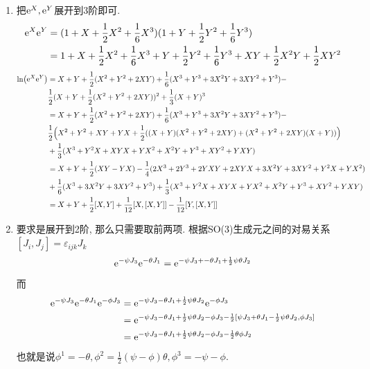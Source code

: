 \begin{solution}
    \begin{enumerate}[label=(\arabic*)]
        \item 把$\mathrm e^{X},\mathrm e^{Y}$展开到3阶即可. 
            \begin{align*}
                \mathrm e^{X}\mathrm e^{Y}&=(1+X+\frac12X^2+\frac16X^3)(1+Y+\frac12Y^2+\frac16Y^3)\\&=
                1+X+\frac12X^2+\frac16X^3+Y+\frac12Y^2+\frac16Y^3+XY+\frac12X^2Y+\frac12XY^2
            \end{align*}
            \begin{align*}
                \ln(\mathrm e^{X}\mathrm e^{Y})&=X+Y+\frac12(X^2+Y^2+2XY)+\frac16(X^3+Y^3+3X^2Y+3XY^2+Y^3)-\\&\frac12(X+Y+\frac12(X^2+Y^2+2XY))^2+\frac13(X+Y)^3\\&=X+Y+\frac12(X^2+Y^2+2XY)+\frac16(X^3+Y^3+3X^2Y+3XY^2+Y^3)-\\&\frac12\Big(X^2+Y^2+XY+YX+\frac12((X+Y)(X^2+Y^2+2XY)+(X^2+Y^2+2XY)(X+Y))\Big)\\&+\frac13(X^3+Y^2X+XYX+YX^2+X^2Y+Y^3+XY^2+YXY)\\&=X+Y+\frac12(XY-YX)-\frac14(2X^3+2Y^3+2YXY+2XYX+3X^2Y+3XY^2+Y^2X+YX^2)\\&+\frac16(X^3+3X^2Y+3XY^2+Y^3)+\frac13(X^3+Y^2X+XYX+YX^2+X^2Y+Y^3+XY^2+YXY)\\&=X+Y+\frac{1}{2}[X,Y]+\frac{1}{12}[X,[X,Y]]-\frac{1}{12}[Y,[X,Y]]
            \end{align*}
        \item 要求是展开到2阶, 那么只需要取前两项. 
        根据SO(3)生成元之间的对易关系$[J_i,J_j]=\varepsilon_{ijk}J_k$
        $$\mathrm e^{-\psi J_3}\mathrm e^{-\theta J_1}=\mathrm e^{-\psi J_3+-\theta J_1+\frac12\psi\theta J_2}$$
        而
        \begin{align*}
            \mathrm e^{-\psi J_3}\mathrm e^{-\theta J_1}\mathrm e^{-\phi J_3}&=\mathrm e^{-\psi J_3-\theta J_1+\frac12\psi\theta J_2}\mathrm e^{-\phi J_3}\\&=\mathrm e^{-\psi J_3-\theta J_1+\frac12\psi\theta J_2-\phi J_3-\frac12[\psi J_3+\theta J_1-\frac12\psi\theta J_2, \phi J_3]}\\&=\mathrm e^{-\psi J_3-\theta J_1+\frac12\psi\theta J_2-\phi J_3-\frac12\theta\phi J_2}
        \end{align*}
        也就是说$\phi^1=-\theta,\phi^2=\frac{1}{2}(\psi-\phi)\theta,\phi^3=-\psi-\phi$.
    \end{enumerate}
\end{solution}


